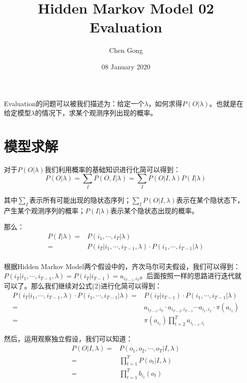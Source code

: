 \documentclass[a4paper]{article}
\title{Hidden Markov Model 02 Evaluation}
\author{Chen Gong}
\date{08 January 2020}
\begin{document}
\maketitle
Evaluation的问题可以被我们描述为：给定一个$\lambda$，如何求得$P(O|\lambda)$。也就是在给定模型$\lambda$的情况下，求某个观测序列出现的概率。

\section{模型求解}
对于$P(O|\lambda)$我们利用概率的基础知识进行化简可以得到：
\begin{equation}
    P(O|\lambda) = \sum_{I}P(O,I|\lambda) = \sum_{I}P(O|I,\lambda)P(I|\lambda)
\end{equation}

其中$\sum_{I}$表示所有可能出现的隐状态序列；$\sum_{I}P(O|I,\lambda)$表示在某个隐状态下，产生某个观测序列的概率；$P(I|\lambda)$表示某个隐状态出现的概率。

那么：
\begin{equation}
    \begin{split}
        P(I|\lambda) = & P(i_1,\cdots,i_T|\lambda) \\
        = & P(i_T|i_1,\cdots,i_{T-1},\lambda)\cdot P(i_1,\cdots,i_{T-1}|\lambda) \\
    \end{split}
\end{equation}

根据Hidden Markov Model两个假设中的，齐次马尔可夫假设，我们可以得到：$P(i_T|i_1,\cdots,i_{T-1},\lambda) = P(i_T|i_{T-1}) = a_{i_{T-1},i_T}$。后面按照一样的思路进行迭代就可以了。那么我们继续对公式(2)进行化简可以得到：
\begin{equation}
    \begin{split}
        P(i_T|i_1,\cdots,i_{T-1},\lambda)\cdot P(i_1,\cdots,i_{T-1}|\lambda) 
        = & P(i_T|i_{T-1}) \cdot P(i_1,\cdots,i_{T-1}|\lambda) \\
        = & a_{i_{T-1},i_T}\cdot a_{i_{T-2},i_{T-1}} \cdots a_{i_1,i_2} \cdot \pi(a_{i_1}) \\
        = & \pi(a_{i_1}) \prod_{t=2}^T a_{i_{t-1},i_t}
    \end{split}
\end{equation}

然后，运用观察独立假设，我们可以知道：
\begin{equation}
    \begin{split}
        P(O|I,\lambda) = & P(o_1,o_2,\cdots,o_T|I,\lambda) \\
        = & \prod_{t=1}^T P(o_t|I,\lambda) \\
        = & \prod_{t=1}^T b_{i_t}(o_t)
    \end{split}
\end{equation}
\end{document}

